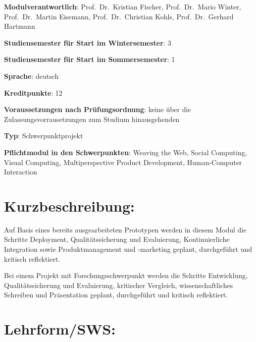 \begin{modulHead}
\textbf{Modulverantwortlich}: Prof.~Dr.~Kristian
Fischer, Prof.~Dr.~Mario Winter, Prof.~Dr.~Martin Eisemann,
Prof.~Dr.~Christian Kohls, Prof.~Dr.~Gerhard
Hartmann
\end{modulHead}
\begin{modulHead}
\textbf{Studiensemester für
Start im Wintersemester}:
3
\end{modulHead}
\begin{modulHead}
\textbf{Studiensemester für Start
im Sommersemester}:
1
\end{modulHead}
\begin{modulHead}
\textbf{Sprache}:
deutsch
\end{modulHead}
\begin{modulHead}
\textbf{Kreditpunkte}:
12
\end{modulHead}
\begin{modulHead}
\textbf{Voraussetzungen nach
Prüfungsordnung}: keine über die Zulassungsvorrausetzungen zum Studium
hinausgehenden
\end{modulHead}
\begin{modulHead}
\textbf{Typ}:
Schwerpunktprojekt
\end{modulHead}
\begin{modulHead}
\textbf{Pflichtmodul
in den Schwerpunkten}: Weaving the Web, Social Computing, Visual
Computing, Multiperspective Product Development, Human-Computer
Interaction
\end{modulHead}


\section*{Kurzbeschreibung:}\label{kurzbeschreibung-4}

Auf Basis eines bereits ausgearbeiteten Prototypen werden in diesem
Modul die Schritte Deployment, Qualitätssicherung und Evaluierung,
Kontinuierliche Integration sowie Produktmanagement und -marketing
geplant, durchgeführt und kritisch reflektiert.

Bei einem Projekt mit Forschungsschwerpunkt werden die Schritte
Entwicklung, Qualitätssicherung und Evaluierung, kritischer Vergleich,
wissenschaftliches Schreiben und Präsentation geplant, durchgeführt und
kritisch reflektiert.

\section*{Lehrform/SWS:}\label{lehrformsws-9}

